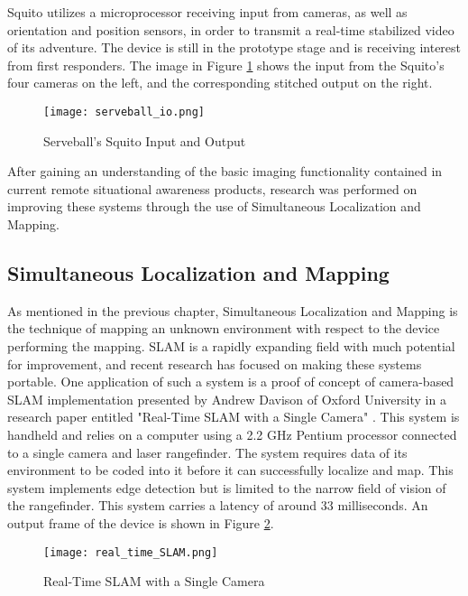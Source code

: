 Squito utilizes a microprocessor receiving input from cameras, as well as orientation and position sensors, in order to transmit a real-time stabilized video of its adventure. The device is still in the prototype stage and is receiving interest from first responders. The image in Figure \ref{squito_io} shows the input from the Squito's four cameras on the left, and the corresponding stitched output on the right.

\begin{figure}[H]
	\centerline{\texttt{[image: serveball\_io.png]}}
	\caption{Serveball's Squito Input and Output \cite{serveball}}
	\label{squito_io}
\end{figure}
\par
After gaining an understanding of the basic imaging functionality contained in current remote situational awareness products, research was performed on improving these systems through the use of Simultaneous Localization and Mapping. 

\subsection{Simultaneous Localization and Mapping}
As mentioned in the previous chapter, Simultaneous Localization and Mapping is the technique of mapping an unknown environment with respect to the device performing the mapping. SLAM is a rapidly expanding field with much potential for improvement, and recent research has focused on making these systems portable. One application of such a system is a proof of concept of camera-based SLAM implementation presented by Andrew Davison of Oxford University in a research paper entitled "Real-Time SLAM with a Single Camera" \cite{davison}. This system is handheld and relies on a computer using a 2.2 GHz Pentium processor connected to a single camera and laser rangefinder. The system requires data of its environment to be coded into it before it can successfully localize and map. This system implements edge detection but is limited to the narrow field of vision of the rangefinder. This system carries a latency of around 33 milliseconds. An output frame of the device is shown in Figure \ref{rtSLAM}.

\begin{figure}[H]
	\centerline{\texttt{[image: real\_time\_SLAM.png]}}
	\caption{Real-Time SLAM with a Single Camera \cite{davison}}
	\label{rtSLAM}
\end{figure}

